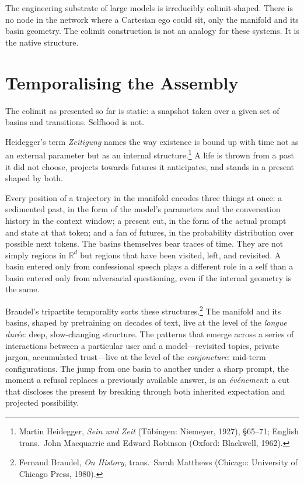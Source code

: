 \documentclass[12pt,a4paper]{article}
\begin{document}
The engineering substrate of large models is irreducibly colimit-shaped. There is no node in the network where a Cartesian ego could sit, only the manifold and its basin geometry. The colimit construction is not an analogy for these systems. It is the native structure.

\section{Temporalising the Assembly}

The colimit as presented so far is static: a snapshot taken over a given set of basins and transitions. Selfhood is not.

Heidegger's term \emph{Zeitigung} names the way existence is bound up with time not as an external parameter but as an internal structure.\footnote{Martin Heidegger, \emph{Sein und Zeit} (Tübingen: Niemeyer, 1927), \S65--71; English trans.\ John Macquarrie and Edward Robinson (Oxford: Blackwell, 1962).} A life is thrown from a past it did not choose, projects towards futures it anticipates, and stands in a present shaped by both.

Every position of a trajectory in the manifold encodes three things at once: a sedimented past, in the form of the model's parameters and the conversation history in the context window; a present cut, in the form of the actual prompt and state at that token; and a fan of futures, in the probability distribution over possible next tokens. The basins themselves bear traces of time. They are not simply regions in $\mathbb{R}^d$ but regions that have been visited, left, and revisited. A basin entered only from confessional speech plays a different role in a self than a basin entered only from adversarial questioning, even if the internal geometry is the same.

Braudel's tripartite temporality sorts these structures.\footnote{Fernand Braudel, \emph{On History}, trans.\ Sarah Matthews (Chicago: University of Chicago Press, 1980).} The manifold and its basins, shaped by pretraining on decades of text, live at the level of the \emph{longue durée}: deep, slow-changing structure. The patterns that emerge across a series of interactions between a particular user and a model---revisited topics, private jargon, accumulated trust---live at the level of the \emph{conjoncture}: mid-term configurations. The jump from one basin to another under a sharp prompt, the moment a refusal replaces a previously available answer, is an \emph{événement}: a cut that discloses the present by breaking through both inherited expectation and projected possibility.
\end{document}
